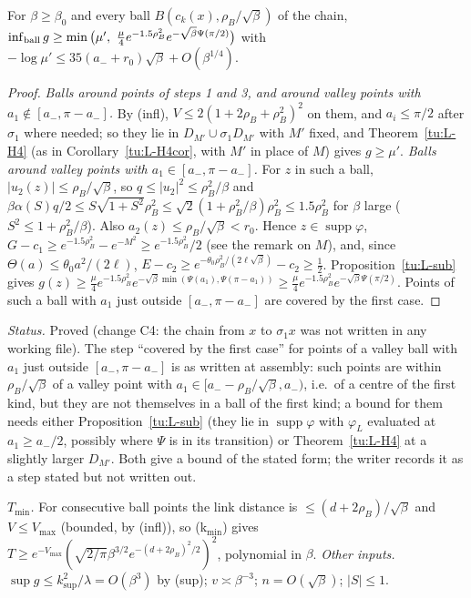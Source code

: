 \begin{lemma}\label{tu:L-balls}
For $\beta\ge\beta_0$ and every ball $B(c_k(x),\rho_B/\sqrt\beta)$ of the chain,
$\inf_{\rm ball}g\ge\min\big(\mu',\ \tfrac\mu4e^{-1.5\rho_B^2}e^{-\sqrt\beta\Psi(\pi/2)}\big)$ with
$-\log\mu'\le35(a_-+r_0)\sqrt\beta+O(\beta^{1/4})$.
\end{lemma}

\begin{proof}
\emph{Balls around points of steps 1 and 3, and around valley points with $a_1\notin[a_-,\pi-a_-]$.} By (infl), $V\le2(1+2\rho_B+\rho_B^2)^2$ on
them, and $a_i\le\pi/2$ after $\sigma_1$ where needed; so they lie in $D_{M'}\cup\sigma_1D_{M'}$ with $M'$ fixed, and
Theorem~\ref{tu:L-H4} (as in Corollary~\ref{tu:L-H4cor}, with $M'$ in place of $M$) gives $g\ge\mu'$.
\emph{Balls around valley points with $a_1\in[a_-,\pi-a_-]$.} For $z$ in such a ball, $|u_2(z)|\le\rho_B/\sqrt\beta$, so
$q\le|u_2|^2\le\rho_B^2/\beta$ and $\beta\alpha(S)q/2\le S\sqrt{1+S^2}\rho_B^2\le\sqrt2(1+\rho_B^2/\beta)\rho_B^2\le1.5\rho_B^2$ for $\beta$ large
($S^2\le1+\rho_B^2/\beta$). Also $a_2(z)\le\rho_B/\sqrt\beta<r_0$. Hence $z\in\operatorname{supp}\varphi$,
$G-c_1\ge e^{-1.5\rho_B^2}-e^{-M^2}\ge e^{-1.5\rho_B^2}/2$ (see the remark on $M$), and, since $\Theta(a)\le\theta_0a^2/(2\ell)$,
$E-c_2\ge e^{-\theta_0\rho_B^2/(2\ell\sqrt\beta)}-c_2\ge\frac12$. Proposition~\ref{tu:L-sub} gives
$g(z)\ge\frac\mu4e^{-1.5\rho_B^2}e^{-\sqrt\beta\min(\Psi(a_1),\Psi(\pi-a_1))}\ge\frac\mu4e^{-1.5\rho_B^2}e^{-\sqrt\beta\Psi(\pi/2)}$.
Points of such a ball with $a_1$ just outside $[a_-,\pi-a_-]$ are covered by the first case.
\end{proof}

\noindent\emph{Status.} Proved (change C4: the chain from $x$ to $\sigma_1x$ was not written in any working file). The step
``covered by the first case'' for points of a valley ball with $a_1$ just outside $[a_-,\pi-a_-]$ is as written at assembly: such
points are within $\rho_B/\sqrt\beta$ of a valley point with $a_1\in[a_--\rho_B/\sqrt\beta,a_-)$, i.e.\ of a centre of the first kind,
but they are not themselves in a ball of the first kind; a bound for them needs either Proposition~\ref{tu:L-sub} (they lie in
$\operatorname{supp}\varphi$ with $\varphi_L$ evaluated at $a_1\ge a_-/2$, possibly where $\Psi$ is in its transition) or
Theorem~\ref{tu:L-H4} at a slightly larger $D_{M'}$. Both give a bound of the stated form; the writer records it as a step
stated but not written out.

\noindent\emph{$T_{\min}$.} For consecutive ball points the link distance is $\le(d+2\rho_B)/\sqrt\beta$ and $V\le V_{\max}$ (bounded,
by (infl)), so (k$_{\min}$) gives $T\ge e^{-V_{\max}}(\sqrt{2/\pi}\beta^{3/2}e^{-(d+2\rho_B)^2/2})^2$, polynomial in $\beta$.
\emph{Other inputs.} $\sup g\le k_{\sup}^2/\lambda=O(\beta^3)$ by (sup); $v\asymp\beta^{-3}$; $n=O(\sqrt\beta)$; $|S|\le1$.

